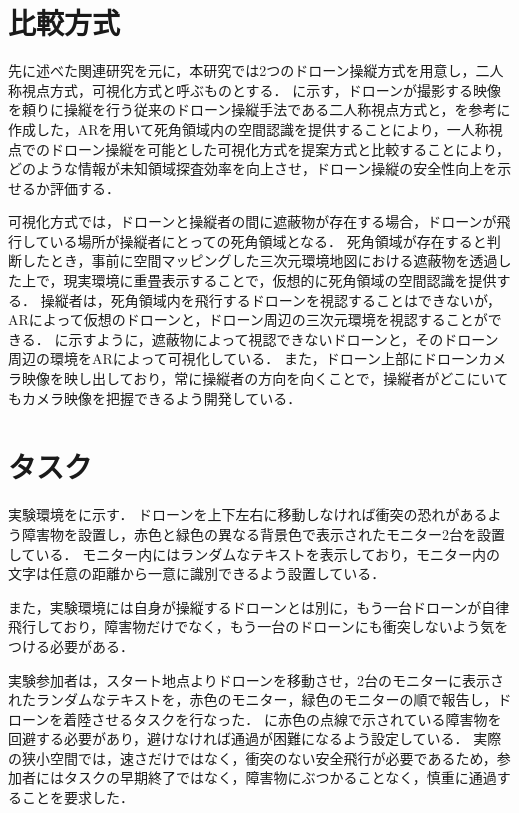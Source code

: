 \documentclass[a4paper,11pt]{ujreport}
\begin{document}
\section{比較方式}
\label{sec:ComparisonMethod}
先に述べた関連研究\cite{article-ar05}を元に，本研究では2つのドローン操縦方式を用意し，二人称視点方式，可視化方式と呼ぶものとする．
に示す，ドローンが撮影する映像を頼りに操縦を行う従来のドローン操縦手法である二人称視点方式と，を参考に作成した，ARを用いて死角領域内の空間認識を提供することにより，一人称視点でのドローン操縦を可能とした可視化方式を提案方式と比較することにより，どのような情報が未知領域探査効率を向上させ，ドローン操縦の安全性向上を示せるか評価する．
\par
可視化方式では，ドローンと操縦者の間に遮蔽物が存在する場合，ドローンが飛行している場所が操縦者にとっての死角領域となる．
死角領域が存在すると判断したとき，事前に空間マッピングした三次元環境地図における遮蔽物を透過した上で，現実環境に重畳表示することで，仮想的に死角領域の空間認識を提供する．
操縦者は，死角領域内を飛行するドローンを視認することはできないが，ARによって仮想のドローンと，ドローン周辺の三次元環境を視認することができる．
に示すように，遮蔽物によって視認できないドローンと，そのドローン周辺の環境をARによって可視化している．
また，ドローン上部にドローンカメラ映像を映し出しており，常に操縦者の方向を向くことで，操縦者がどこにいてもカメラ映像を把握できるよう開発している．

\section{タスク}
\label{sec:Task}

実験環境をに示す．
ドローンを上下左右に移動しなければ衝突の恐れがあるよう障害物を設置し，赤色と緑色の異なる背景色で表示されたモニター2台を設置している．
モニター内にはランダムなテキストを表示しており，モニター内の文字は任意の距離から一意に識別できるよう設置している．
\par
また，実験環境には自身が操縦するドローンとは別に，もう一台ドローンが自律飛行しており，障害物だけでなく，もう一台のドローンにも衝突しないよう気をつける必要がある．
\par
実験参加者は，スタート地点よりドローンを移動させ，2台のモニターに表示されたランダムなテキストを，赤色のモニター，緑色のモニターの順で報告し，ドローンを着陸させるタスクを行なった．
に赤色の点線で示されている障害物を回避する必要があり，避けなければ通過が困難になるよう設定している．
実際の狭小空間では，速さだけではなく，衝突のない安全飛行が必要であるため，参加者にはタスクの早期終了ではなく，障害物にぶつかることなく，慎重に通過することを要求した．
\end{document}
